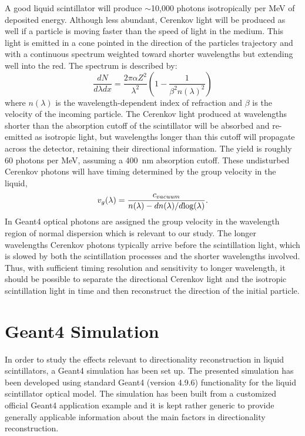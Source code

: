 \documentclass[aps,prc,twocolumn,groupedaddress,showpacs,amsmath,amssymb,floatfix,superscriptaddress]{revtex4}
\begin{document}
A good liquid scintillator will produce $\sim$10,000 photons
isotropically per MeV of deposited energy. Although less abundant,
Cerenkov light will be produced as well if a particle is moving faster
than the speed of light in the medium.  This light is emitted in a
cone pointed in the direction of the particles trajectory and with a
continuous spectrum weighted toward shorter wavelengths
but extending well into the red. The spectrum is described by:
\begin{equation}
\label{eqCerenkov}
\frac{dN}{d\lambda dx} = \frac{2 \pi \alpha Z^2}{\lambda^2} ( 1 - \frac{1}{\beta^2 n(\lambda)^2} )
\end{equation}
where $n(\lambda)$ is the wavelength-dependent index of refraction and
$\beta$ is the velocity of the incoming particle. The Cerenkov light
produced at wavelengths shorter than the absorption cutoff of the
scintillator will be absorbed and re-emitted as isotropic light, but
wavelengths longer than this cutoff will propagate across the
detector, retaining their directional information. The yield is
roughly 60 photons per MeV, assuming a 400~nm absorption
cutoff\cite{qdot}. These undisturbed Cerenkov photons will have timing
determined by the group velocity \cite{group_velocity_article} in the liquid,
\begin{equation}
\label{eqGroup}
v_{g}(\lambda) = \frac{c_{vacuum}}{n(\lambda) - dn(\lambda)/d\textnormal{log}(\lambda)}.
\end{equation}
In Geant4 optical photons are assigned the group velocity in the wavelength 
region of normal dispersion which is relevant to our study. 
The longer wavelengths Cerenkov photons typically arrive before
the scintillation light, which is slowed by both the scintillation
processes and the shorter wavelengths involved. Thus, with sufficient
timing resolution and sensitivity to longer wavelength, it should be
possible to separate the directional Cerenkov light and the isotropic
scintillation light in time and then reconstruct the direction of the
initial particle.

\section{Geant4 Simulation}
In order to study the effects relevant to directionality reconstruction in liquid scintillators, a Geant4 \cite{geant4one,geant4two} simulation has been set up. The presented simulation has been developed using standard Geant4 (version 4.9.6) functionality for the liquid scintillator optical model. The simulation has been built from a customized official Geant4 application example and it is kept rather generic to provide generally applicable information about the main factors in directionality reconstruction. 
\end{document}
